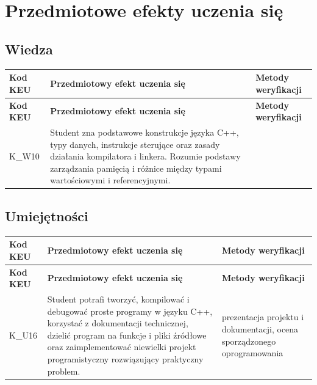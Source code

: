\documentclass[12pt, a4paper]{article}
\newcommand{\thdrule}{\noalign{\global\setlength{\extrarowheight}{0pt}}}
\newcommand{\thdend}{\noalign{\global\setlength{\extrarowheight}{3pt}}}
\begin{document}
\section{Przedmiotowe efekty uczenia się}

\subsection*{Wiedza}
{\scriptsize
\begin{longtable}{m{1.6cm}m{9.0cm}m{4.2cm}}
\thdrule\toprule
\rowcolor{pjatkRed} {\color{white}\footnotesize\textbf{\vphantom{Ag}Kod KEU}} & {\color{white}\footnotesize\textbf{\vphantom{Ag}Przedmiotowy efekt uczenia się}} & {\color{white}\footnotesize\textbf{\vphantom{Ag}Metody weryfikacji}} \\
\midrule\thdend
\endfirsthead
\thdrule\toprule
\rowcolor{pjatkRed} {\color{white}\footnotesize\textbf{\vphantom{Ag}Kod KEU}} & {\color{white}\footnotesize\textbf{\vphantom{Ag}Przedmiotowy efekt uczenia się}} & {\color{white}\footnotesize\textbf{\vphantom{Ag}Metody weryfikacji}} \\
\midrule\thdend
\endhead
  \rowcolor{tableRowLight} K\_W10 & Student zna podstawowe konstrukcje języka C++, typy danych, instrukcje sterujące oraz zasady działania kompilatora i linkera. Rozumie podstawy zarządzania pamięcią i różnice między typami wartościowymi i referencyjnymi. &  \\
\bottomrule
\end{longtable}}

\subsection*{Umiejętności}
{\scriptsize
\begin{longtable}{m{1.6cm}m{9.0cm}m{4.2cm}}
\thdrule\toprule
\rowcolor{pjatkRed} {\color{white}\footnotesize\textbf{\vphantom{Ag}Kod KEU}} & {\color{white}\footnotesize\textbf{\vphantom{Ag}Przedmiotowy efekt uczenia się}} & {\color{white}\footnotesize\textbf{\vphantom{Ag}Metody weryfikacji}} \\
\midrule\thdend
\endfirsthead
\thdrule\toprule
\rowcolor{pjatkRed} {\color{white}\footnotesize\textbf{\vphantom{Ag}Kod KEU}} & {\color{white}\footnotesize\textbf{\vphantom{Ag}Przedmiotowy efekt uczenia się}} & {\color{white}\footnotesize\textbf{\vphantom{Ag}Metody weryfikacji}} \\
\midrule\thdend
\endhead
  \rowcolor{tableRowLight} K\_U16 & Student potrafi tworzyć, kompilować i debugować proste programy w języku C++, korzystać z dokumentacji technicznej, dzielić program na funkcje i pliki źródłowe oraz zaimplementować niewielki projekt programistyczny rozwiązujący praktyczny problem. & prezentacja projektu i dokumentacji, ocena sporządzonego oprogramowania \\
\bottomrule
\end{longtable}}
\end{document}
